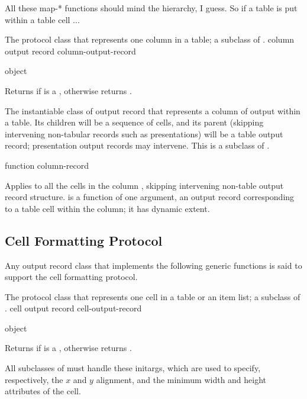  {All these map-* functions should mind the hierarchy, I guess. So if a table is put within a table cell ...}


The protocol class that represents one column in a table; a subclass of
.
 {column output record} {column-output-record}

 {object}

Returns  if  is a , otherwise
returns .


The instantiable class of output record that represents a column of output within
a table.  Its children will be a sequence of cells, and its parent (skipping
intervening non-tabular records such as presentations) will be a table output
record; presentation output records may intervene.  This is a subclass of
.

 {function column-record}

Applies  to all the cells in the column ,
skipping intervening non-table output record structure.   is a
function of one argument, an output record corresponding to a table cell within
the column; it has dynamic extent.


\subsection {Cell Formatting Protocol}

Any output record class that implements the following generic functions is said
to support the cell formatting protocol.


The protocol class that represents one cell in a table or an item list; a
subclass of .
 {cell output record} {cell-output-record}

 {object}

Returns  if  is a , otherwise
returns .


All subclasses of  must handle these initargs, which are
used to specify, respectively, the $x$ and $y$ alignment, and the minimum width
and height attributes of the cell.

